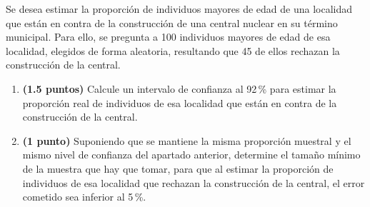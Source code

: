 
Se desea estimar la proporción de individuos mayores de edad de una localidad
que están en contra de la construcción de una central nuclear en su término
municipal. Para ello, se pregunta a 100 individuos mayores de edad de esa
localidad, elegidos de forma aleatoria, resultando que 45 de ellos rechazan
la construcción de la central.
\begin{enumerate}[label=\alph*)]
  \item \textbf{(1.5 puntos)} Calcule un intervalo de confianza al
  92\,\% para estimar la proporción real de individuos de esa localidad
  que están en contra de la construcción de la central.
  \item \textbf{(1 punto)} Suponiendo que se mantiene la misma proporción
  muestral y el mismo nivel de confianza del apartado anterior, determine
  el tamaño mínimo de la muestra que hay que tomar, para que al estimar la
  proporción de individuos de esa localidad que rechazan la construcción
  de la central, el error cometido sea inferior al 5\,\%.
\end{enumerate}
